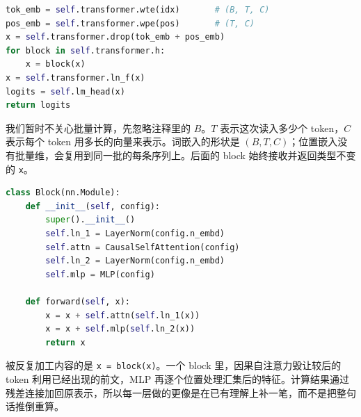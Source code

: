 \begin{lstlisting}[language=Python,caption={GPT-2 主干前向传播}]
tok_emb = self.transformer.wte(idx)       # (B, T, C)
pos_emb = self.transformer.wpe(pos)       # (T, C)
x = self.transformer.drop(tok_emb + pos_emb)
for block in self.transformer.h:
    x = block(x)
x = self.transformer.ln_f(x)
logits = self.lm_head(x)
return logits
\end{lstlisting}

我们暂时不关心批量计算，先忽略注释里的 $B$。$T$ 表示这次读入多少个 token，$C$ 表示每个 token 用多长的向量来表示。词嵌入的形状是 $(B,T,C)$；位置嵌入没有批量维，会复用到同一批的每条序列上。后面的 block 始终接收并返回类型不变的 \texttt{x}。

\begin{lstlisting}[language=Python,caption={带注意力与 MLP 的 Transformer block}]
class Block(nn.Module):
    def __init__(self, config):
        super().__init__()
        self.ln_1 = LayerNorm(config.n_embd)
        self.attn = CausalSelfAttention(config)
        self.ln_2 = LayerNorm(config.n_embd)
        self.mlp = MLP(config)

    def forward(self, x):
        x = x + self.attn(self.ln_1(x))
        x = x + self.mlp(self.ln_2(x))
        return x
\end{lstlisting}


被反复加工内容的是 \texttt{x = block(x)}。一个 block 里，因果自注意力毁让较后的 token 利用已经出现的前文，MLP 再逐个位置处理汇集后的特征。计算结果通过残差连接加回原表示，所以每一层做的更像是在已有理解上补一笔，而不是把整句话推倒重算。

